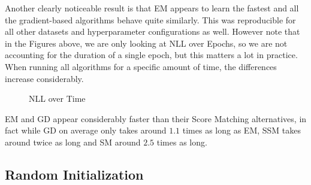 Another clearly noticeable result is that EM appears to learn the fastest and all the gradient-based algorithms
behave quite similarly. This was reproducible for all other datasets and hyperparameter configurations as well. 
However note that in the Figures above, we are only looking at NLL over Epochs, so we are not accounting for the 
duration of a single epoch, but this matters a lot in practice.
When running all algorithms for a specific amount of time, the differences increase considerably. 

\begin{figure}[H]
    \centering
    \caption{NLL over Time}
    \label{fig:spirals_30_kmeans}
\end{figure}

EM and GD appear considerably faster than their Score Matching alternatives, in fact while GD on average only takes 
around $1.1$ times as long as EM, SSM takes around twice as long and SM around $2.5$ times as long.

\subsection{Random Initialization}
\label{sec:2d_exp3}

